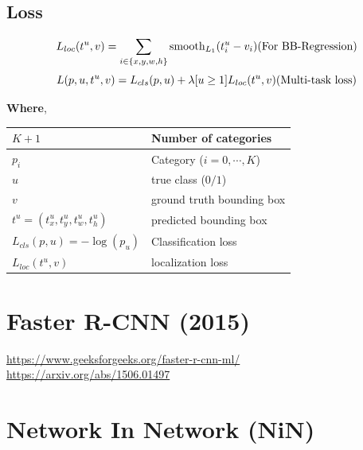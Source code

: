 \subsection*{Loss}
\[
    \displaystyle
    L_{loc}(t^u, v) = \sum_{i \in \dCurlyBrac{x,y,w,h}} \operatorname{smooth}_{L_1}(t_i^u - v_i)
    \hfill
    \text{(For BB-Regression)}
\]
\[
    \displaystyle
    L(p,u,t^u,v) = L_{cls}(p,u) + \lambda[u\geq 1]L_{loc}(t^u, v)
    \hfill
    (\text{Multi-task loss})
\]

\noindent \textbf{Where},
\begin{alternateColorTable}
\renewcommand{\arraystretch}{1.3}
\begin{table}[h]
    \begin{tabular}{l l}
        $K+1$ & Number of categories \\ \hline

        $p_i$ & Category ($i=0,\cdots,K$) \\
        $u$ & true class ($0/1$) \\ \hline

        $v$ & ground truth bounding box \\
        $t^u = (t^u_x,t^u_y,t^u_w,t^u_h)$ & predicted bounding box \\ \hline

        $L_{cls}(p,u) = -\log(p_u)$ & Classification loss \\
        $L_{loc}(t^u,v)$ & localization loss \\
    \end{tabular}
\end{table}
\renewcommand{\arraystretch}{1}
\end{alternateColorTable}


\section{Faster R-CNN (2015) \cite{arxiv/1506.01497-faster-rcnn,gfg/faster-r-cnn-ml}}\label{Faster R-CNN}

\url{https://www.geeksforgeeks.org/faster-r-cnn-ml/}\\
\url{https://arxiv.org/abs/1506.01497}


\section{Network In Network (NiN) \cite{arxiv/1312.4400-nin,medium/towardsdatascience.com/review-nin-network-in-network-image-classification-69e271e499ee}}\label{Network In Network (NiN)}

